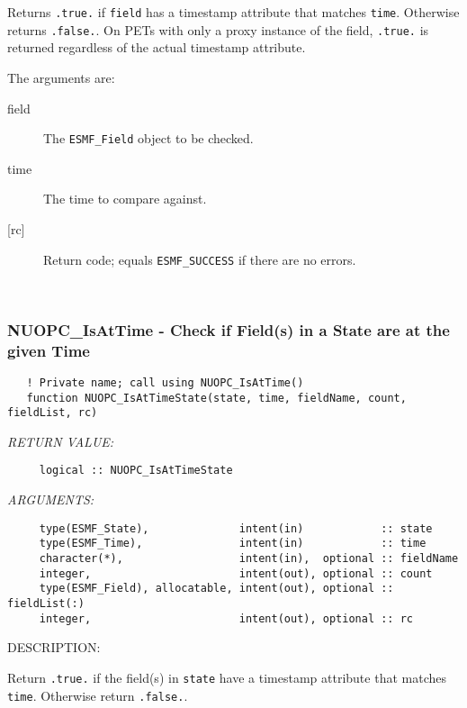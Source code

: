      Returns {\tt .true.} if {\tt field} has a timestamp attribute
     that matches {\tt time}. Otherwise returns {\tt .false.}. On PETs 
     with only a proxy instance of the field, {\tt .true.} is returned
     regardless of the actual timestamp attribute.
  
     The arguments are:
     \begin{description}
     \item[field]
       The {\tt ESMF\_Field} object to be checked.
     \item[time]
       The time to compare against.
     \item[{[rc]}]
       Return code; equals {\tt ESMF\_SUCCESS} if there are no errors.
     \end{description}
   
 
\mbox{}\hrulefill\ 
 
\subsubsection [NUOPC\_IsAtTime] {NUOPC\_IsAtTime - Check if Field(s) in a State are at the given Time}


\begin{verbatim}   ! Private name; call using NUOPC_IsAtTime()
   function NUOPC_IsAtTimeState(state, time, fieldName, count, fieldList, rc)\end{verbatim}{\em RETURN VALUE:}
\begin{verbatim}     logical :: NUOPC_IsAtTimeState\end{verbatim}{\em ARGUMENTS:}
\begin{verbatim}     type(ESMF_State),              intent(in)            :: state
     type(ESMF_Time),               intent(in)            :: time
     character(*),                  intent(in),  optional :: fieldName
     integer,                       intent(out), optional :: count
     type(ESMF_Field), allocatable, intent(out), optional :: fieldList(:)
     integer,                       intent(out), optional :: rc\end{verbatim}
{\sf DESCRIPTION:\\ }


     Return {\tt .true.} if the field(s) in {\tt state} have a timestamp 
     attribute that matches {\tt time}. Otherwise return {\tt .false.}.
  
